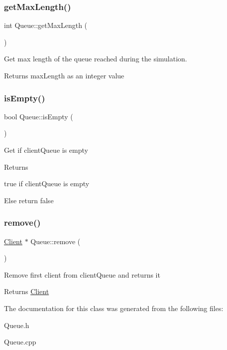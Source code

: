 \subsubsection{\texorpdfstring{get\+Max\+Length()}{getMaxLength()}}
{\footnotesize\ttfamily int Queue\+::get\+Max\+Length (\begin{DoxyParamCaption}{ }\end{DoxyParamCaption})}

Get max length of the queue reached during the simulation. \begin{DoxyReturn}{Returns}
max\+Length as an integer value 
\end{DoxyReturn}
\mbox{\label{classQueue_a65d9b23c23c917faa44981539bc34be7}} 
\subsubsection{\texorpdfstring{is\+Empty()}{isEmpty()}}
{\footnotesize\ttfamily bool Queue\+::is\+Empty (\begin{DoxyParamCaption}{ }\end{DoxyParamCaption})}

Get if client\+Queue is empty \begin{DoxyReturn}{Returns}

\begin{DoxyItemize}
\item true if client\+Queue is empty
\item Else return false 
\end{DoxyItemize}
\end{DoxyReturn}
\mbox{\label{classQueue_a2767e32f2c7f51eedf0b75af9d944f67}} 
\subsubsection{\texorpdfstring{remove()}{remove()}}
{\footnotesize\ttfamily \hyperlink{classClient}{Client} $\ast$ Queue\+::remove (\begin{DoxyParamCaption}{ }\end{DoxyParamCaption})}

Remove first client from client\+Queue and returns it \begin{DoxyReturn}{Returns}
\hyperlink{classClient}{Client} 
\end{DoxyReturn}


The documentation for this class was generated from the following files\+:\begin{DoxyCompactItemize}
\item 
Queue.\+h\item 
Queue.\+cpp\end{DoxyCompactItemize}
